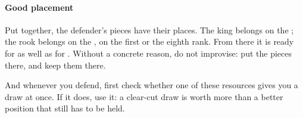 \paragraph{Good placement}

Put together, the defender's pieces have their places. The king belongs on the
; the rook belongs on the , on the first or the eighth rank. From
there it is ready for  as well as for . Without a concrete
reason, do not improvise: put the pieces there, and keep them there.

And whenever you defend, first check whether one of these resources gives you a draw at once.
If it does, use it: a clear-cut draw is worth more than a better position that still
has to be held.
